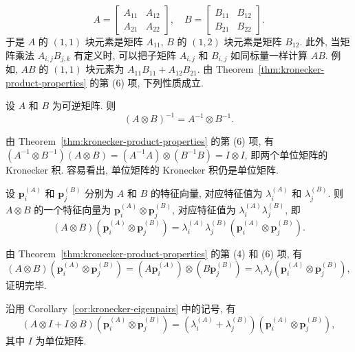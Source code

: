 \[A=\begin{bmatrix}A_{11}&A_{12}\\A_{21}&A_{22}\end{bmatrix},\quad B=\begin{bmatrix}B_{11}&B_{12}\\B_{21}&B_{22}\end{bmatrix}.\]
{于是 $A$ 的 $(1,1)$ 块元素是矩阵 $A_{11}$, $B$ 的 $(1,2)$ 块元素是矩阵 $B_{12}$. 此外, 当矩阵乘法 $A_{i,j}B_{j,k}$ 有定义时, 可以把子矩阵 $A_{i,j}$ 和 $B_{i,j}$ 如同标量一样计算 $AB$. 例如, $AB$ 的 $(1,1)$ 块元素为 $A_{11}B_{11}+A_{12}B_{21}$. 由 Theorem\ \ref{thm:kronecker-product-properties} 的第 (6) 项, 下列性质成立.}
\begin{Corollary}\label{cor:kronecker-inverse}
{设 $A$ 和 $B$ 为可逆矩阵. 则}
\[(A\otimes B)^{-1}=A^{-1}\otimes B^{-1}.\]
\end{Corollary}
\begin{Proof}
{由 Theorem\ \ref{thm:kronecker-product-properties} 的第 (6) 项, 有 $(A^{-1}\otimes B^{-1})(A\otimes B)=(A^{-1}A)\otimes(B^{-1}B)=I\otimes I$, 即两个单位矩阵的 Kronecker 积. 容易看出, 单位矩阵的 Kronecker 积仍是单位矩阵.}
\end{Proof}
\begin{Corollary}\label{cor:kronecker-eigenpairs}
{设 $\boldsymbol{p}_i^{(A)}$ 和 $\boldsymbol{p}_j^{(B)}$ 分别为 $A$ 和 $B$ 的特征向量, 对应特征值为 $\lambda_i^{(A)}$ 和 $\lambda_j^{(B)}$. 则 $A\otimes B$ 的一个特征向量为 $\boldsymbol{p}_i^{(A)}\otimes\boldsymbol{p}_j^{(B)}$, 对应特征值为 $\lambda_i^{(A)}\lambda_j^{(B)}$, 即}
\[(A\otimes B)\left(\boldsymbol{p}_i^{(A)}\otimes\boldsymbol{p}_j^{(B)}\right)=\lambda_i^{(A)}\lambda_j^{(B)}\left(\boldsymbol{p}_i^{(A)}\otimes\boldsymbol{p}_j^{(B)}\right).\]
\end{Corollary}
\begin{Proof}
{由 Theorem\ \ref{thm:kronecker-product-properties} 的第 (4) 和 (6) 项, 有}
\[(A\otimes B)\left(\boldsymbol{p}_i^{(A)}\otimes\boldsymbol{p}_j^{(B)}\right)=\left(A\boldsymbol{p}_i^{(A)}\right)\otimes\left(B\boldsymbol{p}_j^{(B)}\right)=\lambda_i\lambda_j\left(\boldsymbol{p}_i^{(A)}\otimes\boldsymbol{p}_j^{(B)}\right),\]
{证明完毕.}
\end{Proof}
\begin{Corollary}\label{cor:kronecker-sum-eigenpairs}
{沿用 Corollary\ \ref{cor:kronecker-eigenpairs} 中的记号, 有}
\[(A\otimes I+I\otimes B)\left(\boldsymbol{p}_i^{(A)}\otimes\boldsymbol{p}_j^{(B)}\right)=\left(\lambda_i^{(A)}+\lambda_j^{(B)}\right)\left(\boldsymbol{p}_i^{(A)}\otimes\boldsymbol{p}_j^{(B)}\right),\]
{其中 $I$ 为单位矩阵.}
\end{Corollary}

